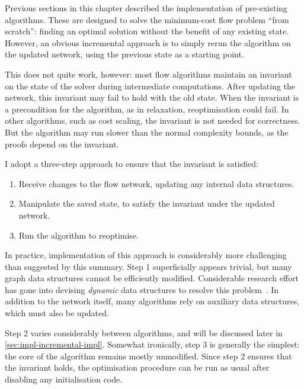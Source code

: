 Previous sections in this chapter described the implementation of pre-existing algorithms. These are designed to solve the minimum-cost flow problem ``from scratch'': finding an optimal solution without the benefit of any existing state. However, an obvious incremental approach is to simply rerun the algorithm on the updated network, using the previous state as a starting point.

This does not quite work, however: most flow algorithms maintain an invariant on the state of the solver during intermediate computations. After updating the network, this invariant may fail to hold with the old state. When the invariant is a precondition for the algorithm, as in relaxation, reoptimisation could fail. In other algorithms, such as cost scaling, the invariant is not needed for correctness. But the algorithm may run slower than the normal complexity bounds, as the proofs depend on the invariant. 

I adopt a three-step approach to ensure that the invariant is satisfied:

\begin{enumerate}
    \item Receive changes to the flow network, updating any internal data structures.
    \item Manipulate the saved state, to satisfy the invariant under the updated network.
    \item Run the algorithm to reoptimise.
\end{enumerate}

In practice, implementation of this approach is considerably more challenging than suggested by this summary. Step 1 superficially appears trivial, but many graph data structures cannot be efficiently modified. Considerable research effort has gone into devising \emph{dynamic} data structures to resolve this problem~\cite{Tarjan:1983,Eppstein:1996}. In addition to the network itself, many algorithms rely on auxiliary data structures\footnotemark, which must also be updated.

Step 2 varies considerably between algorithms, and will be discussed later in \cref{sec:impl-incremental-impl}. Somewhat ironically, step 3 is generally the simplest: the core of the algorithm remains mostly unmodified. Since step 2 ensures that the invariant holds, the optimisation procedure can be run as usual after disabling any initialisation code.

